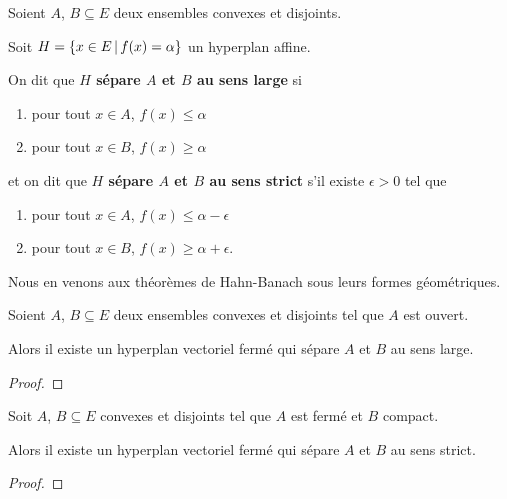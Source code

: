 \begin{definition}
	Soient $A$, $B \subseteq E$ deux ensembles convexes et disjoints.

	Soit $H = \left\{x \in E \, | \, f(x) = \alpha \right\}$ un hyperplan affine.

	On dit que \textbf{$H$ sépare $A$ et $B$ au sens large} si

	\begin{enumerate}
		\item pour tout $x \in A$, $f(x) \leq \alpha$
		\item pour tout $x \in B$, $f(x) \geq \alpha$
	\end{enumerate}

	et on dit que \textbf{$H$ sépare $A$ et $B$ au sens strict} s'il existe
	$\epsilon > 0$ tel que

	\begin{enumerate}
		\item pour tout $x \in A$, $f(x) \leq \alpha -
	\epsilon$
		\item pour tout $x \in B$, $f(x) \geq \alpha + \epsilon$.
	\end{enumerate}
\end{definition}

Nous en venons aux théorèmes de Hahn-Banach sous leurs formes géométriques.

\begin{theorem} 
	Soient $A$, $B \subseteq E$ deux ensembles convexes et disjoints tel que $A$ est ouvert.

	Alors il existe un hyperplan vectoriel fermé qui sépare $A$ et $B$ au sens
	large.
\end{theorem}

\ifdefined\outputproof
\begin{proof}

\end{proof}
\fi

\begin{theorem} 
	Soit $A$, $B \subseteq E$ convexes et disjoints tel que $A$ est fermé et $B$
	compact.

	Alors il existe un hyperplan vectoriel fermé qui sépare $A$ et $B$ au sens
	strict.
\end{theorem}

\ifdefined\outputproof
\begin{proof}

\end{proof}
\fi

